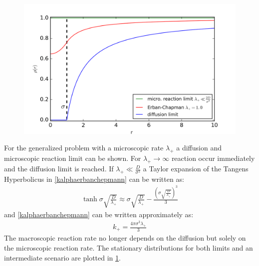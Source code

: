 \documentclass[
  a4paper,BCOR10mm,oneside,
  headsepline,footsepline,%
  fleqn,openbib
]{scrbook}
\begin{document}
\begin{figure}[h!]
  \centering
  \includegraphics[width=\textwidth]{./data/smoluchowskierban.png}
  \captionsetup{width=\linewidth}
  \label{fig:diffusion_limit-Erban-Chapmann-figure}
\end{figure}
\par
For the generalized problem with a microscopic rate $\lambda_{+}$ a diffusion and microscopic reaction limit can be shown. For $\lambda_{+} \rightarrow \infty $ reaction occur immediately and the diffusion limit is reached. If  $\lambda_{+} \ll \frac{D}{\sigma^2}$ a Taylor expansion of the Tangens Hyperbolicus in \cref{kalphaerbanchepmann} can be written as:
\begin{align}
\tanh{\sigma \sqrt{\frac{D}{\lambda_{+}}}} \approx \sigma \sqrt{\frac{D}{\lambda_{+}}}-\frac{\left(\sigma \sqrt{\frac{D}{\lambda_{+}}}\right)^3}{3}
\end{align}
and \cref{kalphaerbanchepmann} can be written approximately as:
\begin{align}
 k_{+}=\frac{4 \pi \sigma^3 \lambda_{+}}{3}
\end{align}
The macroscopic reaction rate no longer depends on the diffusion but solely on the microscopic reaction rate. The stationary distributions for both limits and an intermediate scenario are plotted in \cref{fig:diffusion_limit-Erban-Chapmann-figure}.\par
\end{document}
